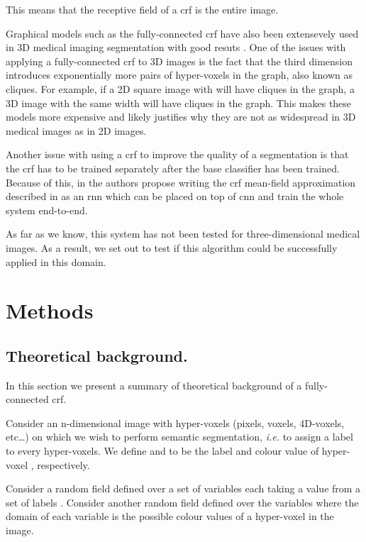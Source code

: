 \documentclass{article}
\begin{document}
This means that the receptive field of a \gls{crf} is the entire image.


Graphical models such as the fully-connected \gls{crf} have also been extensevely used in 3D medical imaging segmentation with good resuts \cite{medseg_example_1, medseg_example_2, medseg_example_3, medseg_example_4, medseg_example_5}.
One of the issues with applying a fully-connected \gls{crf} to 3D images is the fact that the third dimension introduces exponentially more pairs of hyper-voxels in the graph, also known as cliques. For example, if a 2D square image with  will have  cliques in the graph, a 3D image with the same width will have  cliques in the graph.
This makes these models more expensive and likely justifies why they are not as widespread in 3D medical images as in 2D images.


Another issue with using a \gls{crf} to improve the quality of a segmentation is that the \gls{crf} has to be trained separately after the base classifier has been trained. 
Because of this, in \cite{CRFasRNN} the authors propose writing the \gls{crf} mean-field approximation described in \cite{FullyConnectedCRF} as an \gls{rnn} which can be placed on top of \gls{cnn} and train the whole system end-to-end.

As far as we know, this system has not been tested for three-dimensional medical images.
As a result, we set out to test if this algorithm could be successfully applied in this domain.

\section{Methods}

\subsection{Theoretical background.}
In this section we present a summary of theoretical background of a fully-connected \gls{crf}\cite{FullyConnectedCRF}.

Consider an n-dimensional image with  hyper-voxels (pixels, voxels, 4D-voxels, etc\dots) on which we wish to perform semantic segmentation, \textit{i.e.} to assign a label to every hyper-voxels.
We define  and  to be the label and colour value of hyper-voxel , respectively.

Consider a random field  defined over a set of variables  each taking a value from a set of labels .
Consider another random field  defined over the variables  where the domain of each variable is the possible colour values of a hyper-voxel in the image.
\end{document}
